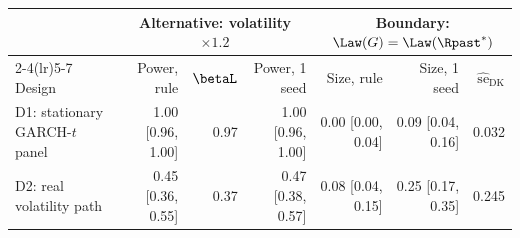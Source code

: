 \begin{tabular}{lrrrrrr}
\toprule
 & \multicolumn{3}{c}{Alternative: volatility $\times1.2$} & \multicolumn{3}{c}{Boundary: $\Law(G)=\Law(\Rpast^*)$} \\
\cmidrule(lr){2-4}\cmidrule(lr){5-7}
Design & Power, rule & $\betaL$ & Power, 1 seed & Size, rule & Size, 1 seed & $\widehat{\mathrm{se}}_{\mathrm{DK}}$ \\
\midrule
D1: stationary GARCH-$t$ panel & 1.00 [0.96, 1.00] & 0.97 & 1.00 [0.96, 1.00] & 0.00 [0.00, 0.04] & 0.09 [0.04, 0.16] & 0.032 \\
D2: real \TRAIN{} volatility path & 0.45 [0.36, 0.55] & 0.37 & 0.47 [0.38, 0.57] & 0.08 [0.04, 0.15] & 0.25 [0.17, 0.35] & 0.245 \\
\bottomrule
\end{tabular}
